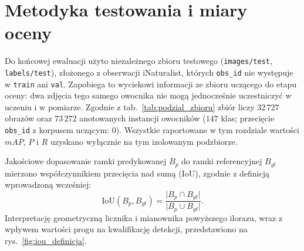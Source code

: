\section{Metodyka testowania i miary oceny}
Do końcowej ewaluacji użyto niezależnego zbioru testowego (\texttt{images/test}, \texttt{labels/test}), złożonego z obserwacji iNaturalist, których \texttt{obs\_id} nie występuje w \texttt{train} ani \texttt{val}. Zapobiega to wyciekowi informacji ze zbioru uczącego do etapu oceny: dwa zdjęcia tego samego owocnika nie mogą jednocześnie uczestniczyć w uczeniu i w pomiarze. Zgodnie z tab.~\ref{tab:podzial_zbioru} zbiór liczy $32\,727$ obrazów oraz $73\,272$ anotowanych instancji owocników ($147$ klas; przecięcie \texttt{obs\_id} z korpusem uczącym: $0$). Wszystkie raportowane w tym rozdziale wartości $mAP$, $P$ i $R$ uzyskano wyłącznie na tym izolowanym podzbiorze.

Jakościowe dopasowanie ramki predykowanej $B_p$ do ramki referencyjnej $B_{gt}$ mierzono współczynnikiem przecięcia nad sumą (IoU), zgodnie z definicją wprowadzoną wcześniej:
\begin{equation}
\mathrm{IoU}(B_p, B_{gt}) = \frac{\lvert B_p \cap B_{gt} \rvert}{\lvert B_p \cup B_{gt} \rvert}.
\end{equation}
Interpretację geometryczną licznika i mianownika powyższego ilorazu, wraz z wpływem wartości progu na kwalifikację detekcji, przedstawiono na rys.~\ref{fig:iou_definicja}.

